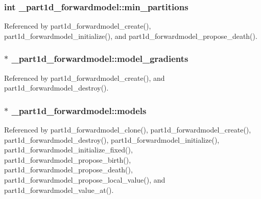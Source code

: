 \subsubsection[{\texorpdfstring{min\+\_\+partitions}{min_partitions}}]{\setlength{\rightskip}{0pt plus 5cm}int \+\_\+part1d\+\_\+forwardmodel\+::min\+\_\+partitions}\hypertarget{struct__part1d__forwardmodel_ada490ee1ccf061f81a21051d2e6b4fd0}{}\label{struct__part1d__forwardmodel_ada490ee1ccf061f81a21051d2e6b4fd0}


Referenced by part1d\+\_\+forwardmodel\+\_\+create(), part1d\+\_\+forwardmodel\+\_\+initialize(), and part1d\+\_\+forwardmodel\+\_\+propose\+\_\+death().

\subsubsection[{\texorpdfstring{model\+\_\+gradients}{model_gradients}}]{$\ast$ \+\_\+part1d\+\_\+forwardmodel\+::model\+\_\+gradients}\hypertarget{struct__part1d__forwardmodel_a5ba03ec9048f0f0951a34f84cb5f2390}{}\label{struct__part1d__forwardmodel_a5ba03ec9048f0f0951a34f84cb5f2390}


Referenced by part1d\+\_\+forwardmodel\+\_\+create(), and part1d\+\_\+forwardmodel\+\_\+destroy().

\subsubsection[{\texorpdfstring{models}{models}}]{$\ast$ \+\_\+part1d\+\_\+forwardmodel\+::models}\hypertarget{struct__part1d__forwardmodel_a135ea522c684e646fa2398aaeed0f264}{}\label{struct__part1d__forwardmodel_a135ea522c684e646fa2398aaeed0f264}


Referenced by part1d\+\_\+forwardmodel\+\_\+clone(), part1d\+\_\+forwardmodel\+\_\+create(), part1d\+\_\+forwardmodel\+\_\+destroy(), part1d\+\_\+forwardmodel\+\_\+initialize(), part1d\+\_\+forwardmodel\+\_\+initialize\+\_\+fixed(), part1d\+\_\+forwardmodel\+\_\+propose\+\_\+birth(), part1d\+\_\+forwardmodel\+\_\+propose\+\_\+death(), part1d\+\_\+forwardmodel\+\_\+propose\+\_\+local\+\_\+value(), and part1d\+\_\+forwardmodel\+\_\+value\+\_\+at().

